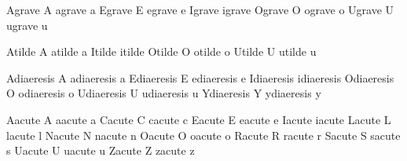  Agrave {\buildtextaccent\textgrave A} 
 agrave {\buildtextaccent\textgrave a}
 Egrave {\buildtextaccent\textgrave E}
 egrave {\buildtextaccent\textgrave e}
 Igrave {\buildtextaccent\textgrave \dotlessI}
 igrave {\buildtextaccent\textgrave \dotlessi}
 Ograve {\buildtextaccent\textgrave O}
 ograve {\buildtextaccent\textgrave o}
 Ugrave {\buildtextaccent\textgrave U}
 ugrave {\buildtextaccent\textgrave u}
     
 Atilde {\buildtextaccent\texttilde A}
 atilde {\buildtextaccent\texttilde a}
 Itilde {\buildtextaccent\texttilde \dotlessI}
 itilde {\buildtextaccent\texttilde \dotlessi}
 Otilde {\buildtextaccent\texttilde O}
 otilde {\buildtextaccent\texttilde o}
 Utilde {\buildtextaccent\texttilde U}
 utilde {\buildtextaccent\texttilde u}

 Adiaeresis {\buildtextaccent\textdiaeresis A}
 adiaeresis {\buildtextaccent\textdiaeresis a}
 Ediaeresis {\buildtextaccent\textdiaeresis E}
 ediaeresis {\buildtextaccent\textdiaeresis e}
 Idiaeresis {\buildtextaccent\textdiaeresis \dotlessI}
 idiaeresis {\buildtextaccent\textdiaeresis \dotlessi}
 Odiaeresis {\buildtextaccent\textdiaeresis O}
 odiaeresis {\buildtextaccent\textdiaeresis o}
 Udiaeresis {\buildtextaccent\textdiaeresis U}
 udiaeresis {\buildtextaccent\textdiaeresis u}
 Ydiaeresis {\buildtextaccent\textdiaeresis Y}
 ydiaeresis {\buildtextaccent\textdiaeresis y}

 Aacute {\buildtextaccent\textacute A}
 aacute {\buildtextaccent\textacute a}
 Cacute {\buildtextaccent\textacute C}
 cacute {\buildtextaccent\textacute c}
 Eacute {\buildtextaccent\textacute E}
 eacute {\buildtextaccent\textacute e}
 Iacute {\buildtextaccent\textacute \dotlessI}
 iacute {\buildtextaccent\textacute \dotlessi}
 Lacute {\buildtextaccent\textacute L}
 lacute {\buildtextaccent\textacute l}
 Nacute {\buildtextaccent\textacute N}
 nacute {\buildtextaccent\textacute n}
 Oacute {\buildtextaccent\textacute O}
 oacute {\buildtextaccent\textacute o}
 Racute {\buildtextaccent\textacute R}
 racute {\buildtextaccent\textacute r}
 Sacute {\buildtextaccent\textacute S}
 sacute {\buildtextaccent\textacute s}
 Uacute {\buildtextaccent\textacute U}
 uacute {\buildtextaccent\textacute u}
 Zacute {\buildtextaccent\textacute Z}
 zacute {\buildtextaccent\textacute z}

